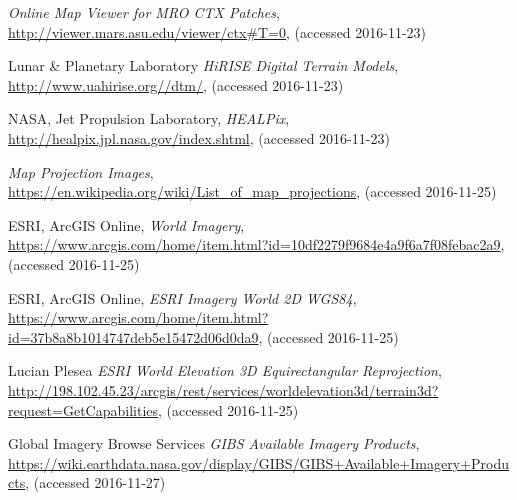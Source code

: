 \begin{thebibliography}{99}
  \emph{Online Map Viewer for MRO CTX Patches},
  \\
  \url{http://viewer.mars.asu.edu/viewer/ctx#T=0},
  (accessed 2016-11-23)
  
  Lunar \& Planetary Laboratory
  \emph{HiRISE Digital Terrain Models},
  \\
  \url{http://www.uahirise.org//dtm/},
  (accessed 2016-11-23)
  
  NASA, Jet Propulsion Laboratory,
  \emph{HEALPix},
  \\
  \url{http://healpix.jpl.nasa.gov/index.shtml},
  (accessed 2016-11-23)
  
  \emph{Map Projection Images},
  \\
  \url{https://en.wikipedia.org/wiki/List_of_map_projections},
  (accessed 2016-11-25)
  
  ESRI, ArcGIS Online,
  \emph{World Imagery},
  \\
  \url{https://www.arcgis.com/home/item.html?id=10df2279f9684e4a9f6a7f08febac2a9},
  (accessed 2016-11-25)
  
  ESRI, ArcGIS Online,
  \emph{ESRI Imagery World 2D WGS84},
  \\
  \url{https://www.arcgis.com/home/item.html?id=37b8a8b1014747deb5e15472d06d0da9},
  (accessed 2016-11-25)
  
  Lucian Plesea
  \emph{ESRI World Elevation 3D Equirectangular Reprojection},
  \\
  \url{http://198.102.45.23/arcgis/rest/services/worldelevation3d/terrain3d?request=GetCapabilities},
  (accessed 2016-11-25)
  
  Global Imagery Browse Services
  \emph{GIBS Available Imagery Products},
  \\
  \url{https://wiki.earthdata.nasa.gov/display/GIBS/GIBS+Available+Imagery+Products},
  (accessed 2016-11-27)
  
\end{thebibliography}
